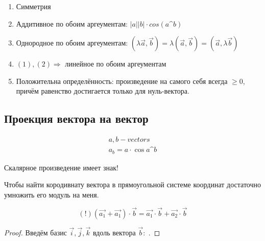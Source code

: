 \documentclass[12pt, a4paper]{article}
\begin{document}
    \begin{property}
        \begin{enumerate}
            \item Симметрия
            \item Аддитивное по обоим аргеументам: $|a||b| \cdot cos(a\^b)$
            \item Однородное по обоим аргеументам: $(\lambda\vec{a}, \vec{b}) = \lambda(\vec{a}, \vec{b}) = (\vec{a}, \lambda\vec{b})$
            \item $(1), (2) \Rightarrow$ линейное по обоим аргеументам
            \item Положительна определённость: произведение на самого себя всегда $\geq 0$, 
            причём равенство достигается только для нуль-вектора.
        \end{enumerate}
    \end{property}


    \subsection{Проекция вектора на вектор}
    \begin{definition}
        \begin{gather}
            a, b - vectors \\
            a_b = a \cdot \cos{a\^b}
        \end{gather}

        \begin{note}
            Скалярное произведение имеет знак!
        \end{note}
    \end{definition}

    Чтобы найти кородивнату вектора в прямоугольной системе координат достаточно умножить его модуль на меня.

    \begin{theorem}
        \begin{equation}
            (!) (\vec{a_1} + \vec{a_1}) \cdot \vec{b} = \vec{a_1} \cdot \vec{b} + \vec{a_2} \cdot \vec{b}
        \end{equation}
    \end{theorem}
    \begin{proof}
        Введём базис $\vec{i}, \vec{j}, \vec{k}$ 
        вдоль вектора $\vec{b}$: $\frac{}{}$.
    \end{proof}
\end{document}
